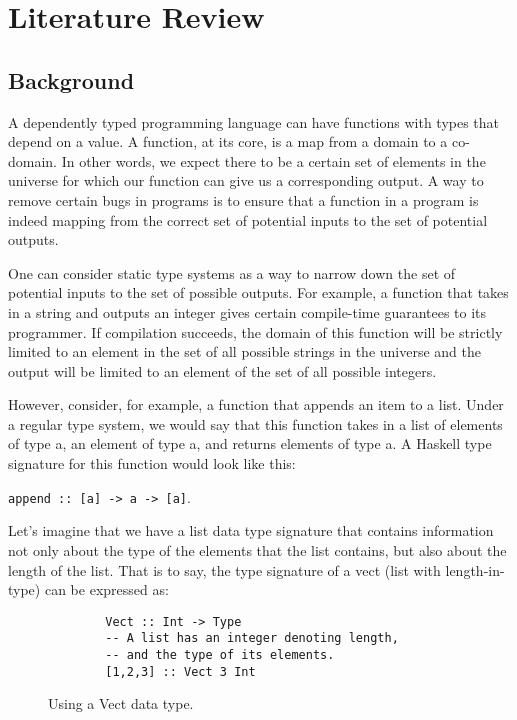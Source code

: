
\chapter{Literature Review}

\section{Background}
A dependently typed programming language can have functions with types that
depend on a value. A function, at its core, is a map from a domain to a
co-domain. In other words, we expect there to be a certain set of elements in
the universe for which our function can give us a corresponding output. A way to
remove certain bugs in programs is to ensure that a function in a program is
indeed mapping from the correct set of potential inputs to the set of potential
outputs. 

One can consider static type systems as a way to narrow down the set of
potential inputs to the set of possible outputs. For example, a function that
takes in a string and outputs an integer gives certain compile-time guarantees
to its programmer. If compilation succeeds, the domain of this function will be
strictly limited to an element in the set of all possible strings in the
universe and the output will be limited to an element of the set of all possible
integers. 

However, consider, for example, a function that appends an item to a list. Under
a regular type system, we would say that this function takes in a list of
elements of type a, an element of type a, and returns elements of type a. A
Haskell type signature for this function would look like this: 

\texttt{append :: [a] -> a -> [a]}. 


Let's imagine that we have a list data type signature that contains information
not only about the type of the elements that the list contains, but also about
the length of the list. That is to say, the type signature of a vect (list with
length-in-type) can be expressed as: 

\begin{figure}
    \caption{Using a Vect data type.}
    \begin{lstlisting}
        Vect :: Int -> Type
        -- A list has an integer denoting length, 
        -- and the type of its elements.
        [1,2,3] :: Vect 3 Int
    \end{lstlisting}
\end{figure} 


